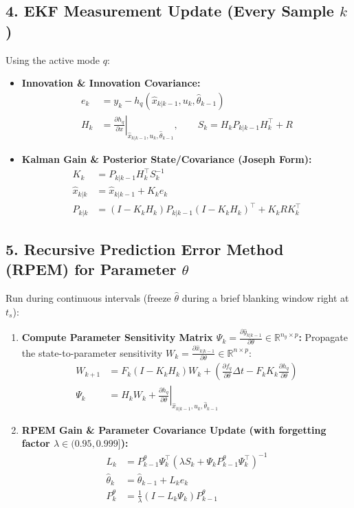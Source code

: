 \documentclass{article}
\begin{document}
\subsection*{4. EKF Measurement Update (Every Sample $k$)}
Using the active mode $q$:

\begin{itemize}
    \item \textbf{Innovation \& Innovation Covariance:}
    \begin{align}
        e_k &= y_k - h_q(\hat{x}_{k|k-1}, u_k, \hat{\theta}_{k-1}) \\
        H_k &= \left. \frac{\partial h_q}{\partial x} \right|_{\hat{x}_{k|k-1}, u_k, \hat{\theta}_{k-1}}, \qquad S_k = H_k P_{k|k-1} H_k^\top + R
    \end{align}
    
    \item \textbf{Kalman Gain \& Posterior State/Covariance (Joseph Form):}
    \begin{align}
        K_k &= P_{k|k-1} H_k^\top S_k^{-1} \\
        \hat{x}_{k|k} &= \hat{x}_{k|k-1} + K_k e_k \\
        P_{k|k} &= (I - K_k H_k) P_{k|k-1} (I - K_k H_k)^\top + K_k R K_k^\top
    \end{align}
\end{itemize}

\subsection*{5. Recursive Prediction Error Method (RPEM) for Parameter $\theta$}
Run during continuous intervals (freeze $\hat{\theta}$ during a brief blanking window right at $t_s$):

\begin{enumerate}
    \item \textbf{Compute Parameter Sensitivity Matrix $\Psi_k = \frac{\partial \hat{y}_{k|k-1}}{\partial \theta} \in \mathbb{R}^{n_y \times p}$:}
    Propagate the state-to-parameter sensitivity $W_k = \frac{\partial \hat{x}_{k|k-1}}{\partial \theta} \in \mathbb{R}^{n \times p}$:
    \begin{align}
        W_{k+1} &= F_k (I - K_k H_k) W_k + \left( \frac{\partial f_q}{\partial \theta} \Delta t - F_k K_k \frac{\partial h_q}{\partial \theta} \right) \\
        \Psi_k &= H_k W_k + \left. \frac{\partial h_q}{\partial \theta} \right|_{\hat{x}_{k|k-1}, u_k, \hat{\theta}_{k-1}}
    \end{align}
    
    \item \textbf{RPEM Gain \& Parameter Covariance Update (with forgetting factor $\lambda \in (0.95, 0.999]$):}
    \begin{align}
        L_k &= P^\theta_{k-1} \Psi_k^\top \left( \lambda S_k + \Psi_k P^\theta_{k-1} \Psi_k^\top \right)^{-1} \\
        \hat{\theta}_k &= \hat{\theta}_{k-1} + L_k e_k \\
        P^\theta_k &= \frac{1}{\lambda} \left( I - L_k \Psi_k \right) P^\theta_{k-1}
    \end{align}
\end{enumerate}
\end{document}
